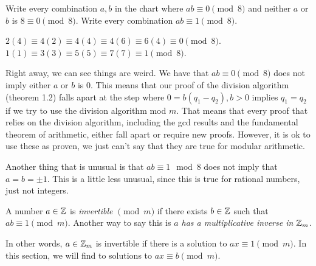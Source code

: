\documentclass[letterpaper, 11 pt]{article}
\begin{document}
\begin{example}
 Write every combination $a,b$ in the chart where $ab\equiv 0 \!\pmod 8$ and neither $a$ or $b$ is $8\equiv 0 \!\pmod8$. Write every combination $ab\equiv 1 \!\pmod 8$.
\end{example}
\begin{solution}
$ 2(4)\equiv4(2)\equiv4(4)\equiv4(6)\equiv6(4) \equiv 0\!\pmod8$. $1(1)\equiv 3(3)\equiv5(5)\equiv7(7)\equiv 1 \!\pmod8$.
\end{solution}

Right away, we can see things are weird. We have that $ab\equiv 0 \!\pmod 8$ does not imply either $a$ or $b$ is 0. This means that our proof of the division algorithm (theorem 1.2) falls apart at the step where $0=b(q_1-q_2), b>0$ implies $q_1=q_2$ if we try to use the division algorithm mod $m$. That means that every proof that relies on the division algorithm, including the gcd results and the fundamental theorem of arithmetic, either fall apart or require new proofs. However, it is ok to use these as proven, we just can't say that they are true for modular arithmetic.

Another thing that is unusual is that $ab\equiv 1 \mod8$ does not imply that $a=b=\pm1$. This is a little less unusual, since this is true for rational numbers, just not integers.
\begin{defn}
 A number $a\in\mathbb Z$ is \emph{invertible $\!\pmod m$} if there exists $b\in\mathbb Z$ such that $ab\equiv 1\!\pmod m$. Another way to say this is \emph{$a$ has a multiplicative inverse in $\mathbb Z_m$}.
\end{defn}

In other words, $a\in\mathbb Z_m$ is invertible if there is a solution to $ax\equiv 1 \pmod m$. In this section, we will find to  solutions to $ax\equiv b \pmod m$.




\end{document}
